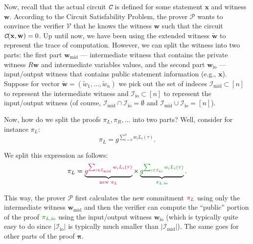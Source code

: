 \documentclass[../lecture-notes-148x210.tex]{subfiles}
\begin{document}
Now, recall that the actual circuit $\textit{\texttt{C}}$ is defined for some statement $\mathbf{x}$ and witness $\mathbf{w}$. According to the Circuit Satisfability Problem, 
the prover $\mathcal{P}$ wants to convince the verifier $\mathcal{V}$ that he knows the witness $\mathbf{w}$ 
such that the circuit $\textit{\texttt{C}}(\mathbf{x}, \mathbf{w}) = 0$. Up until now, we have been using 
the extended witness $\widetilde{\mathbf{w}}$ to represent the trace of computation. 
However, we can split the witness into two parts: the first part $\mathbf{w}_{\text{mid}}$ --- intermediate witness 
that contains the private witness $R\mathbf{w}$ and intermediate variables values, and 
the second part $\mathbf{w}_{\text{io}}$ --- input/output witness that contains public 
statement information (e.g., $\mathbf{x}$). Suppose for vector $\widetilde{\mathbf{w}} = (\widetilde{w}_1,\dots,\widetilde{w}_n)$ 
we pick out the set of indeces $\mathcal{I}_{\text{mid}} \subset [n]$ to represent the intermediate witness 
and $\mathcal{I}_{\text{io}} \subset [n]$ to represent the input/output witness 
(of course, $\mathcal{I}_{\text{mid}} \cap \mathcal{I}_{\text{io}} = \emptyset$ 
and $\mathcal{I}_{\text{mid}} \cup \mathcal{I}_{\text{io}} = [n]$).

Now, how do we split the proofs $\pi_L,\pi_R,\dots$ into two parts? Well, consider for instance $\pi_L$:
\begin{equation*}
    \pi_L = g^{\sum_{i=0}^n w_iL_i(\tau)}.
\end{equation*}

We split this expression as follows:
\begin{equation*}
    \pi_L = \underbrace{\textcolor{purple}{g^{\sum_{i \in \mathcal{I}_{\text{mid}}} w_iL_i(\tau)}}}_{\textcolor{purple}{\text{new $\pi_L$}}} 
    \times 
    \underbrace{\textcolor{green!50!black}{g^{\sum_{i \in \mathcal{I}_{\text{io}}} w_iL_i(\tau)}}}_{\textcolor{green!50!black}{\pi_{L,\text{io}}}}.
\end{equation*}

This way, the prover $\mathcal{P}$ first calculates the new commitment $\textcolor{purple}{\pi_L}$ using 
only the intermediate witness $\mathbf{w}_{\text{mid}}$ and then 
the verifier can compute the ``public'' portion of the proof $\textcolor{green!50!black}{\pi_{L,\text{io}}}$ 
using the input/output witness $\mathbf{w}_{\text{io}}$ 
(which is typically quite easy to do since $|\mathcal{I}_{\text{io}}|$ is typically much smaller than 
$|\mathcal{I}_{\text{mid}}|$). The same goes for other parts of the proof $\boldsymbol{\pi}$.
\end{document}
